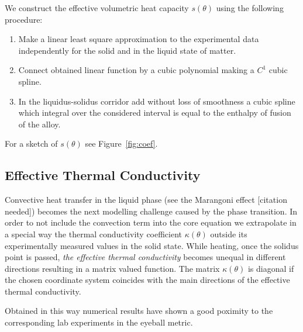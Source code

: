 We construct the effective volumetric heat capacity $s(\theta)$ using the following procedure:
\begin{enumerate}
	\item Make a linear least square approximation to the experimental data independently for the solid and in the liquid state of matter.
	\item Connect obtained linear function by a cubic polynomial making a $C^1$ cubic spline.
	\item In the liquidus-solidus corridor add without loss of smoothness a cubic spline which integral over the considered interval is equal to the enthalpy of fusion of the alloy.
\end{enumerate}


For a sketch of $s(\theta)$ see Figure~\ref{fig:coef}.

\subsection{Effective Thermal Conductivity}
\label{subsec:conductivity}

Convective heat transfer in the liquid phase (see the Marangoni effect [citation needed]) becomes the next modelling challenge caused by the phase transition. In order to not include the convection term into the core equation we extrapolate in a special way the thermal conductivity coefficient $\kappa(\theta)$ outside its experimentally measured values in the solid state. While heating, once the solidus point is passed, \emph{the effective thermal conductivity} becomes unequal in different directions resulting in a matrix valued function. The matrix $\kappa(\theta)$ is diagonal if the chosen coordinate system coincides with the main directions of the effective thermal conductivity.

{\color{TolHighContrastBlue}
Obtained in this way numerical results have shown a good poximity to the corresponding lab experiments in the eyeball metric.
}

